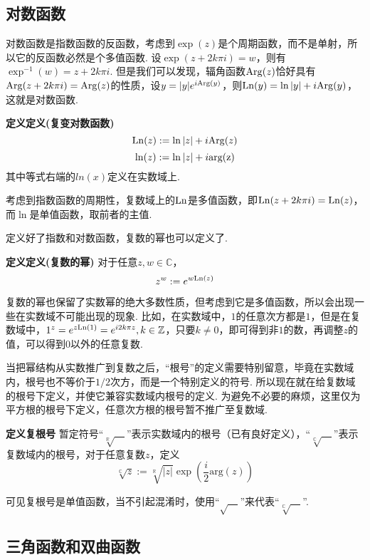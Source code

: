 \documentclass[UTF8]{ctexart}
\newcommand{\trm}[1]{{\rm #1}}
\newenvironment{definition}[1]
    {\begin{tcolorbox}[enhanced, colback=LightYellow, breakable=false, frame hidden, borderline west={1.5mm}{-2mm}{DarkGreen}]
    {\bfseries {\color{DarkGreen} 定义}\quad #1} \newline}
    {\end{tcolorbox}}
\begin{document}
\subsection{对数函数}

对数函数是指数函数的反函数，考虑到\(\exp(z)\)是个周期函数，而不是单射，所以它的反函数必然是个多值函数. 设\(\exp(z+2k\pi i)=w\)，则有\(\exp^{-1}(w)=z+2k\pi i\). 但是我们可以发现，辐角函数\(\trm{Arg}(z)\)恰好具有\(\trm{Arg}(z+2k\pi i)=\trm{Arg}(z)\)的性质，设\(y=|y|e^{i{\rm Arg}(y)}\)，则\({\rm Ln}(y)=\ln|y|+i{\rm Arg}(y)\)，这就是对数函数.
\begin{definition}{定义(复变对数函数)}
    \[{\rm Ln}(z):=\ln|z|+i{\rm Arg}(z)\]
    \[\ln(z):=\ln|z|+i{\rm arg(z)}\]
    其中等式右端的\(ln(x)\)定义在实数域上.
\end{definition}
考虑到指数函数的周期性，复数域上的\({\rm Ln}\)是多值函数，即\({\rm Ln}(z+2k\pi i)={\rm Ln}(z)\)，而\(\ln\)是单值函数，取前者的主值.

定义好了指数和对数函数，复数的幂也可以定义了. 
\begin{definition}{定义(复数的幂)}
    对于任意\(z,w \in \mathbb{C}\)，
    \[z^w := e^{w{\rm Ln}(z)}\]
\end{definition}

复数的幂也保留了实数幂的绝大多数性质，但考虑到它是多值函数，所以会出现一些在实数域不可能出现的现象. 比如，在实数域中，\(1\)的任意次方都是\(1\)，但是在复数域中，\(1^z = e^{z{\rm Ln}(1)} = e^{i2k\pi z}, k \in \mathbb{Z}\)，只要\(k \neq  0\)，即可得到非\(1\)的数，再调整\(z\)的值，可以得到\(0\)以外的任意复数.

当把幂结构从实数推广到复数之后，“根号”的定义需要特别留意，毕竟在实数域内，根号也不等价于\(1/2\)次方，而是一个特别定义的符号. 所以现在就在给复数域的根号下定义，并使它兼容实数域内根号的定义. 为避免不必要的麻烦，这里仅为平方根的根号下定义，任意次方根的根号暂不推广至复数域.

\begin{definition}{复根号}
    暂定符号“\(\sqrt[\mathbb{R}]{\quad}\)”表示实数域内的根号（已有良好定义），“\(\sqrt[\mathbb{C}]{\quad}\)”表示复数域内的根号，对于任意复数\(z\)，定义
    \[\sqrt[\mathbb{C}]{z} := \sqrt[\mathbb{R}]{|z|}\exp\left(\frac{i}{2}\mathrm{arg}(z)\right)\]
\end{definition}
可见复根号是单值函数，当不引起混淆时，使用“\(\sqrt{\quad}\)”来代表“\(\sqrt[\mathbb{C}]{\quad}\)”.

\subsection{三角函数和双曲函数}
\end{document}
